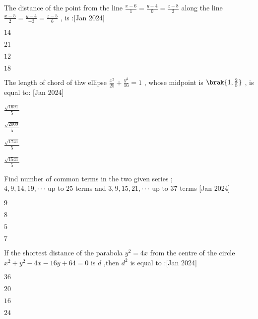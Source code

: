 \item The distance of the point  from the line $ \frac{x-6}{1}=\frac{y-4}{0}=\frac{z-8}{3} $ along the line $ \frac{x-5}{2}=\frac{y-4}{-3}=\frac{z-5}{6} $ , is :\hfill{[Jan 2024]}
\begin{enumerate}   
\begin{multicols}{4}
\item $14$
\item $21$
\item $12$
\item $18$                                                                        
\end{multicols}
\end{enumerate}
\item The length of chord of thw ellipse $ \frac{x^2}{25} + \frac{y^2}{16} = 1 $ , whose midpoint is $ \brak{1,\frac{2}{5}} $ , is equal to: \hfill{[Jan 2024]}
\begin{enumerate}
\begin{multicols}{4}
\item $ \frac{\sqrt{1691}}{5} $
\item $ \frac{\sqrt{2009}}{5} $
\item $ \frac{\sqrt{1741}}{5} $
\item $ \frac{\sqrt{1541}}{5} $
\end{multicols}
\end{enumerate}
\item Find number of common terms in the two given series ; \\ $ 4, 9, 14, 19,\cdot\cdot\cdot $ up to $ 25 $ terms and $ 3, 9, 15, 21,\cdot\cdot\cdot $ up to $ 37 $ terms \hfill{[Jan 2024]}
\begin{enumerate}
\begin{multicols}{4}
\item $9$
\item $8$
\item $5$
\item $7$
\end{multicols}
\end{enumerate}
\item If the shortest distance of the parabola $ y^2=4x $ from the centre of the circle $ x^2+y^2-4x-16y+64=0 $ is $d$ ,then $ d^2 $ is equal to :\hfill{[Jan 2024]}
\begin{enumerate}   
\begin{multicols}{4}
\item $36$
\item $20$
\item $16$
\item $24$
\end{multicols}	
\end{enumerate}
